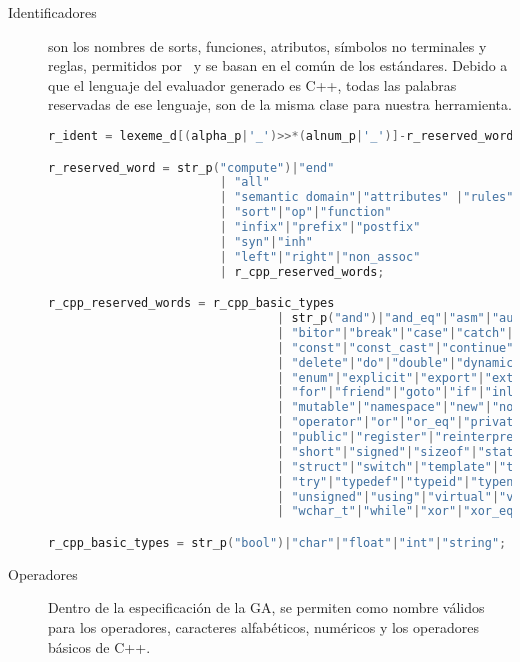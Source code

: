\begin{description}
\item [Identificadores] son los nombres de sorts, funciones, atributos, símbolos no terminales y reglas, permitidos por \maggen\ y se basan en el común de los estándares. Debido a que el lenguaje del evaluador generado es C++, todas las palabras reservadas de ese lenguaje, son de la misma clase para nuestra herramienta.

\begin{lstlisting}[float=!ht, language=C++, basicstyle=\scriptsize, columns=fullflexible, linewidth=11cm]
r_ident = lexeme_d[(alpha_p|'_')>>*(alnum_p|'_')]-r_reserved_word;

r_reserved_word = str_p("compute")|"end"
                        | "all"
                        | "semantic domain"|"attributes" |"rules"
                        | "sort"|"op"|"function"
                        | "infix"|"prefix"|"postfix"
                        | "syn"|"inh"
                        | "left"|"right"|"non_assoc"
                        | r_cpp_reserved_words;

r_cpp_reserved_words = r_cpp_basic_types
                                | str_p("and")|"and_eq"|"asm"|"auto"|"bitand"
                                | "bitor"|"break"|"case"|"catch"|"class"|"compl"
                                | "const"|"const_cast"|"continue"|"default"
                                | "delete"|"do"|"double"|"dynamic_cast"|"else"
                                | "enum"|"explicit"|"export"|"extern"|"false"
                                | "for"|"friend"|"goto"|"if"|"inline"|"long"
                                | "mutable"|"namespace"|"new"|"not"|"not_eq"
                                | "operator"|"or"|"or_eq"|"private"|"protected"
                                | "public"|"register"|"reinterpret_cast"|"return"
                                | "short"|"signed"|"sizeof"|"static"|"static_cast"
                                | "struct"|"switch"|"template"|"this"|"throw"|"true"
                                | "try"|"typedef"|"typeid"|"typename"|"union"
                                | "unsigned"|"using"|"virtual"|"void"|"volatile"
                                | "wchar_t"|"while"|"xor"|"xor_eq";

r_cpp_basic_types = str_p("bool")|"char"|"float"|"int"|"string";
\end{lstlisting}

\item [Operadores] Dentro de la especificación de la GA, se permiten como nombre válidos para los operadores, caracteres alfabéticos, numéricos y los operadores básicos de C++. 


\end{description}
